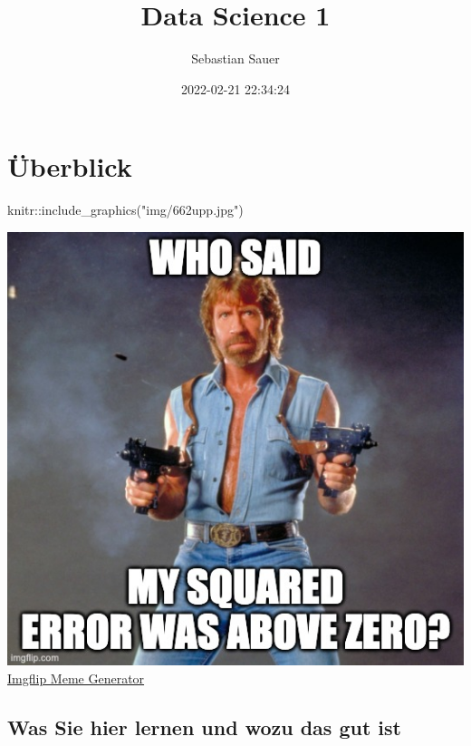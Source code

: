 \documentclass[
]{book}
\title{Data Science 1}
\author{Sebastian Sauer}
\date{2022-02-21 22:34:24}
\newenvironment{Shaded}{\begin{snugshade}}{\end{snugshade}}
\newcommand{\FunctionTok}[1]{\textcolor[rgb]{0.00,0.00,0.00}{#1}}
\newcommand{\NormalTok}[1]{#1}
\newcommand{\SpecialCharTok}[1]{\textcolor[rgb]{0.00,0.00,0.00}{#1}}
\newcommand{\StringTok}[1]{\textcolor[rgb]{0.31,0.60,0.02}{#1}}
\begin{document}
\maketitle

{
\setcounter{tocdepth}{1}
\tableofcontents
}
\hypertarget{uxfcberblick}{%
\chapter{Überblick}\label{uxfcberblick}}

\begin{Shaded}
\begin{Highlighting}[]
\NormalTok{knitr}\SpecialCharTok{::}\FunctionTok{include\_graphics}\NormalTok{(}\StringTok{"img/662upp.jpg"}\NormalTok{)}
\end{Highlighting}
\end{Shaded}

\includegraphics[width=7.32in]{img/662upp}
\href{https://imgflip.com/i/662upp}{Imgflip Meme Generator}

\hypertarget{was-sie-hier-lernen-und-wozu-das-gut-ist}{%
\section{Was Sie hier lernen und wozu das gut ist}\label{was-sie-hier-lernen-und-wozu-das-gut-ist}}
\end{document}
